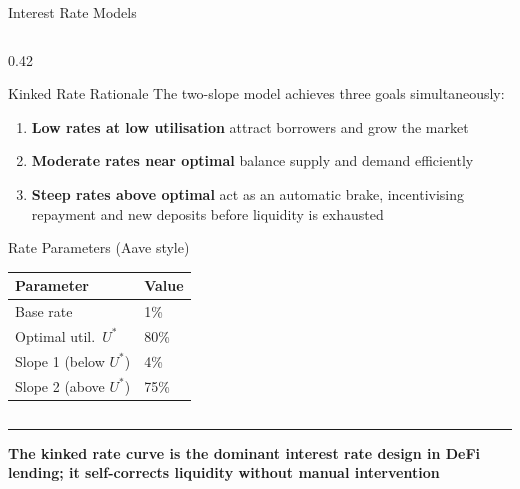 \documentclass[8pt,aspectratio=169]{beamer}
\newcommand{\bottomnote}[1]{\vfill\vspace{-2mm}\textcolor{mllavender2}{\rule{\textwidth}{0.4pt}}\vspace{1mm}\footnotesize\textbf{#1}}
\begin{document}
\begin{frame}{Interest Rate Models}
\begin{columns}[T]
\begin{column}{0.42\textwidth}
\begin{block}{Kinked Rate Rationale}
        The two-slope model achieves three goals simultaneously:
        \begin{enumerate}\setlength\itemsep{3pt}
          \item \textbf{Low rates at low utilisation} attract borrowers and grow the market
          \item \textbf{Moderate rates near optimal} balance supply and demand efficiently
          \item \textbf{Steep rates above optimal} act as an automatic brake, incentivising
                repayment and new deposits before liquidity is exhausted
        \end{enumerate}
      \end{block}
      \vspace{3mm}
      \begin{block}{Rate Parameters (Aave style)}
        \begin{tabular}{ll}
          \toprule
          Parameter & Value \\
          \midrule
          Base rate      & 1\%  \\
          Optimal util.\ $U^*$ & 80\% \\
          Slope 1 (below $U^*$)    & 4\%  \\
          Slope 2 (above $U^*$)    & 75\% \\
          \bottomrule
        \end{tabular}
      \end{block}
    \end{column}
  \end{columns}
  \bottomnote{The kinked rate curve is the dominant interest rate design in DeFi lending; it self-corrects liquidity without manual intervention}
\end{frame}
\end{document}
